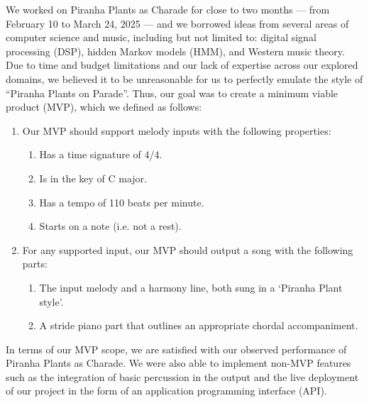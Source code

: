 We worked on Piranha Plants as Charade for close to two months --- from February 10 to March 24, 2025 --- and we borrowed ideas from several areas of computer science and music, including but not limited to: digital signal processing (DSP), hidden Markov models (HMM), and Western music theory. Due to time and budget limitations and our lack of expertise across our explored domains, we believed it to be unreasonable for us to perfectly emulate the style of ``Piranha Plants on Parade''. Thus, our goal was to create a minimum viable product (MVP), which we defined as follows:
\begin{enumerate}
    \item Our MVP should support melody inputs with the following properties:
    \begin{enumerate}
        \item Has a time signature of 4/4.
        \item Is in the key of C major.
        \item Has a tempo of 110 beats per minute.
        \item Starts on a note (i.e. not a rest).
    \end{enumerate}
    \item For any supported input, our MVP should output a song with the following parts:
    \begin{enumerate}
        \item The input melody and a harmony line, both sung in a `Piranha Plant style'.
        \item A stride piano part that outlines an appropriate chordal accompaniment.
    \end{enumerate}
\end{enumerate}
In terms of our MVP scope, we are satisfied with our observed performance of Piranha Plants as Charade. We were also able to implement non-MVP features such as the integration of basic percussion in the output and the live deployment of our project in the form of an application programming interface (API).